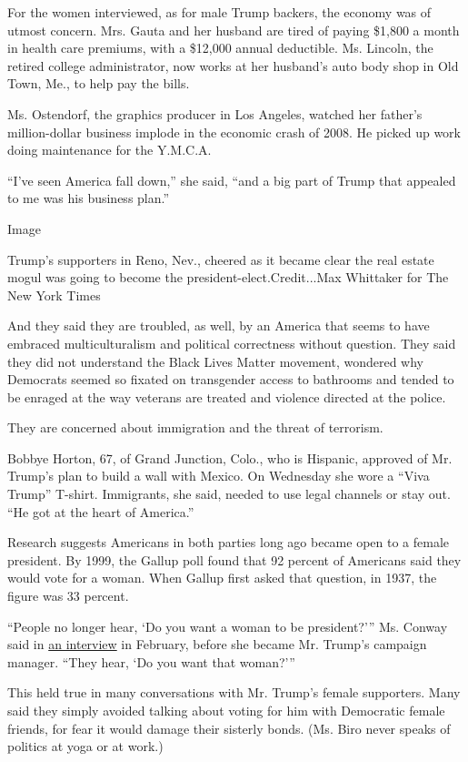 For the women interviewed, as for male Trump backers, the economy was of
utmost concern. Mrs. Gauta and her husband are tired of paying \$1,800 a
month in health care premiums, with a \$12,000 annual deductible. Ms.
Lincoln, the retired college administrator, now works at her husband's
auto body shop in Old Town, Me., to help pay the bills.

Ms. Ostendorf, the graphics producer in Los Angeles, watched her
father's million-dollar business implode in the economic crash of 2008.
He picked up work doing maintenance for the Y.M.C.A.

``I've seen America fall down,'' she said, ``and a big part of Trump
that appealed to me was his business plan.''

Image

Trump's supporters in Reno, Nev., cheered as it became clear the real
estate mogul was going to become the president-elect.Credit...Max
Whittaker for The New York Times

And they said they are troubled, as well, by an America that seems to
have embraced multiculturalism and political correctness without
question. They said they did not understand the Black Lives Matter
movement, wondered why Democrats seemed so fixated on transgender access
to bathrooms and tended to be enraged at the way veterans are treated
and violence directed at the police.

They are concerned about immigration and the threat of terrorism.

Bobbye Horton, 67, of Grand Junction, Colo., who is Hispanic, approved
of Mr. Trump's plan to build a wall with Mexico. On Wednesday she wore a
``Viva Trump'' T-shirt. Immigrants, she said, needed to use legal
channels or stay out. ``He got at the heart of America.''

Research suggests Americans in both parties long ago became open to a
female president. By 1999, the Gallup poll found that 92 percent of
Americans said they would vote for a woman. When Gallup first asked that
question, in 1937, the figure was 33 percent.

``People no longer hear, `Do you want a woman to be president?''' Ms.
Conway said in
\href{http://www.nytimes3xbfgragh.onion/2016/02/17/us/hillary-clintons-candidacy-reveals-generational-schism-among-women.html}{an
interview} in February, before she became Mr. Trump's campaign manager.
``They hear, `Do you want that woman?'''

This held true in many conversations with Mr. Trump's female supporters.
Many said they simply avoided talking about voting for him with
Democratic female friends, for fear it would damage their sisterly
bonds. (Ms. Biro never speaks of politics at yoga or at work.)

